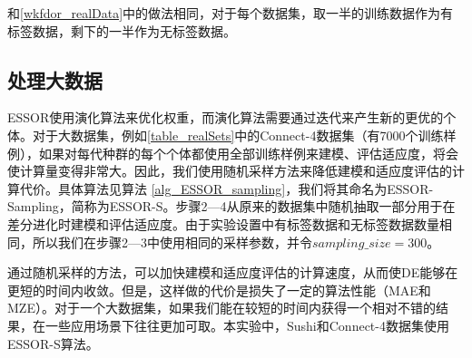 
和\autoref{wkfdor_realData}中的做法相同，对于每个数据集，取一半的训练数据作为有标签数据，剩下的一半作为无标签数据。

\subsection{处理大数据}

ESSOR使用演化算法来优化权重，而演化算法需要通过迭代来产生新的更优的个体。对于大数据集，例如\autoref{table_realSets}中的Connect-4数据集（有7000个训练样例），如果对每代种群的每个个体都使用全部训练样例来建模、评估适应度，将会使计算量变得非常大。因此，我们使用随机采样方法来降低建模和适应度评估的计算代价。具体算法见算法 \ref{alg_ESSOR_sampling}，我们将其命名为ESSOR-Sampling，简称为ESSOR-S。步骤2—4从原来的数据集中随机抽取一部分用于在差分进化时建模和评估适应度。由于实验设置中有标签数据和无标签数据数量相同，所以我们在步骤2—3中使用相同的采样参数，并令\(sampling\_size = 300\)。

通过随机采样的方法，可以加快建模和适应度评估的计算速度，从而使DE能够在更短的时间内收敛。但是，这样做的代价是损失了一定的算法性能（MAE和MZE）。对于一个大数据集，如果我们能在较短的时间内获得一个相对不错的结果，在一些应用场景下往往更加可取。本实验中，Sushi和Connect-4数据集使用ESSOR-S算法。

~\\
~\\
~\\
~\\

